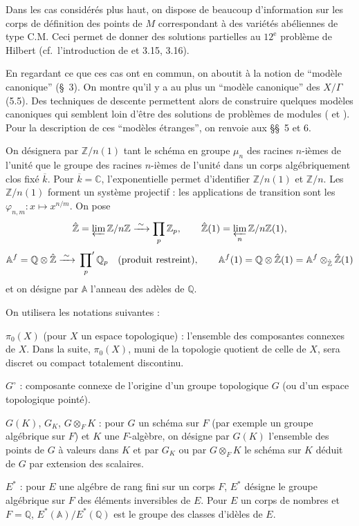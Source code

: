 \documentclass[11pt]{amsart}
\theoremstyle{plain}
\theoremstyle{definition}
\newcommand{\ZZ}{\mathbb{Z}}
\newcommand{\QQ}{\mathbb{Q}}
\newcommand{\CC}{\mathbb{C}}
\newcommand{\AAf}{\mathbb{A}^f}
\begin{document}
Dans les cas consid\'er\'es plus haut, on dispose de beaucoup d'information sur les corps de d\'efinition des points de $M$ correspondant \`a des vari\'et\'es ab\'eliennes de type C.M. Ceci permet de donner des solutions partielles au $12^{\text{e}}$ probl\`eme de Hilbert (cf.\ l'introduction de \cite{Sh6} et 3.15, 3.16).

En regardant ce que ces cas ont en commun, on aboutit \`a la notion de ``mod\`ele canonique'' (\S\ 3). On montre qu'il y a au plus un ``mod\`ele canonique'' des $X/\Gamma$ (5.5). Des techniques de descente permettent alors de construire quelques mod\`eles canoniques qui semblent loin d'\^etre des solutions de probl\`emes de modules (\cite{Sh3} \cite{Sh4} \cite{Sh5} et \cite{Mi}). Pour la description de ces ``mod\`eles \'etranges'', on renvoie aux \S\S\ 5 et 6.

On d\'esignera par $\ZZ/n(1)$ tant le sch\'ema en groupe $\mu_n$ des racines $n$-i\`emes de l'unit\'e que le groupe des racines $n$-i\`emes de l'unit\'e dans un corps alg\'ebriquement clos fix\'e $\overline{k}$. Pour $\overline{k} = \CC$, l'exponentielle permet d'identifier $\ZZ/n(1)$ et $\ZZ/n$. Les $\ZZ/n(1)$ forment un syst\`eme projectif : les applications de transition sont les $\varphi_{n,m} : x \mapsto x^{n/m}$. On pose
\[
\hat{\ZZ} = \varprojlim \ZZ/n\ZZ \xrightarrow{\;\sim\;} \prod_p \ZZ_p, \qquad \hat{\ZZ}(1) = \varprojlim_n \ZZ/n\ZZ(1),
\]
\[
\AAf = \QQ \otimes \hat{\ZZ} \xrightarrow{\;\sim\;} \sideset{}{'}\prod_p \QQ_p \quad \text{(produit restreint)}, \qquad \AAf(1) = \QQ \otimes \hat{\ZZ}(1) = \AAf \otimes_{\hat{\ZZ}} \hat{\ZZ}(1)
\]
et on d\'esigne par $\mathbb{A}$ l'anneau des ad\`eles de $\QQ$.

On utilisera les notations suivantes :

$\pi_0(X)$ (pour $X$ un espace topologique) : l'ensemble des composantes connexes de $X$. Dans la suite, $\pi_0(X)$, muni de la topologie quotient de celle de $X$, sera discret ou compact totalement discontinu.

$G^\circ$ : composante connexe de l'origine d'un groupe topologique $G$ (ou d'un espace topologique point\'e).

$G(K)$, $G_K$, $G \otimes_F K$ : pour $G$ un sch\'ema sur $F$ (par exemple un groupe alg\'ebrique sur $F$) et $K$ une $F$-alg\`ebre, on d\'esigne par $G(K)$ l'ensemble des points de $G$ \`a valeurs dans $K$ et par $G_K$ ou par $G \otimes_F K$ le sch\'ema sur $K$ d\'eduit de $G$ par extension des scalaires.

$E^*$ : pour $E$ une alg\'ebre de rang fini sur un corps $F$, $E^*$ d\'esigne le groupe alg\'ebrique sur $F$ des \'el\'ements inversibles de $E$. Pour $E$ un corps de nombres et $F = \QQ$, $E^*(\mathbb{A})/E^*(\QQ)$ est le groupe des classes d'id\`eles de $E$.
\end{document}
